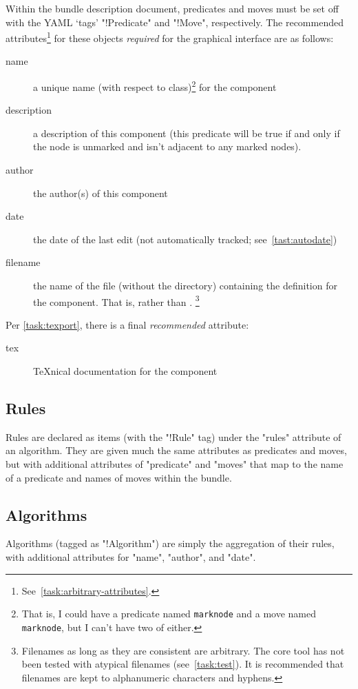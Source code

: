 Within the bundle description document,
predicates and moves must be set off with the YAML \enquote*{tags} "!Predicate" and "!Move", respectively.
The recommended attributes\footnote{See~\autoref{task:arbitrary-attributes}.}
  for these objects \Dash \emph{required} for the graphical interface \Dash
  are as follows:
\begin{description}
\item[name] a unique name (with respect to class)\footnote{That is, I could have a predicate named \texttt{marknode} and a move named \texttt{marknode}, but I can't have two of either.} for the component
\item[description] a description of this component (\eg this predicate
  will be true if and only if the node is unmarked and isn't adjacent
  to any marked nodes).
\item[author] the author(s) of this component
\item[date] the date of the last edit (not automatically tracked; see~\autoref{tast:autodate})
\item[filename] the name of the file (without the directory) containing the definition for the component.
  That is,  rather than .%
  \footnote{Filenames \Dash as long as they are consistent \Dash are arbitrary.
    The core tool has not been tested with atypical filenames (see~\autoref{task:test}).
    It is recommended that filenames are kept to alphanumeric characters and hyphens.}
\end{description}
Per \autoref{task:texport}, there is a final \emph{recommended} attribute:
\begin{description}
\item[tex] \TeX nical documentation for the component
\end{description}


\subsection{Rules}
\label{sec:rules}

Rules are declared as items (with the "!Rule" tag)
  under the "rules" attribute of an algorithm.
They are given much the same attributes as predicates and moves,
  but with additional attributes of "predicate" and "moves"
  that map to the name of a predicate and names of moves within the bundle.

\subsection{Algorithms}
\label{sec:algorithms}

Algorithms (tagged as "!Algorithm") are simply the aggregation of their rules,
  with additional attributes for "name", "author", and "date".
